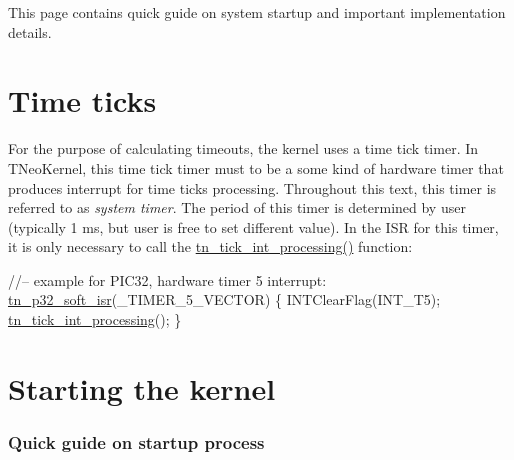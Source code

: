 This page contains quick guide on system startup and important implementation details.\hypertarget{quick_guide_time_ticks}{}\section{Time ticks}\label{quick_guide_time_ticks}
For the purpose of calculating timeouts, the kernel uses a time tick timer. In T\+Neo\+Kernel, this time tick timer must to be a some kind of hardware timer that produces interrupt for time ticks processing. Throughout this text, this timer is referred to as {\itshape system timer}. The period of this timer is determined by user (typically 1 ms, but user is free to set different value). In the I\+S\+R for this timer, it is only necessary to call the {\ttfamily \hyperlink{tn__sys_8h_a944d96c7a5d442d271115b6cb22a085b}{tn\+\_\+tick\+\_\+int\+\_\+processing()}} function\+:


\begin{DoxyCode}
\textcolor{comment}{//-- example for PIC32, hardware timer 5 interrupt:}
\hyperlink{tn__arch__pic32_8h_a02d853d8d573f928fb8da65ef0c2bc8e}{tn\_p32\_soft\_isr}(\_TIMER\_5\_VECTOR)
\{
   INTClearFlag(INT\_T5);
   \hyperlink{tn__sys_8h_a944d96c7a5d442d271115b6cb22a085b}{tn\_tick\_int\_processing}();
\}
\end{DoxyCode}
\hypertarget{quick_guide_starting_the_kernel}{}\section{Starting the kernel}\label{quick_guide_starting_the_kernel}
\subsubsection*{Quick guide on startup process}


